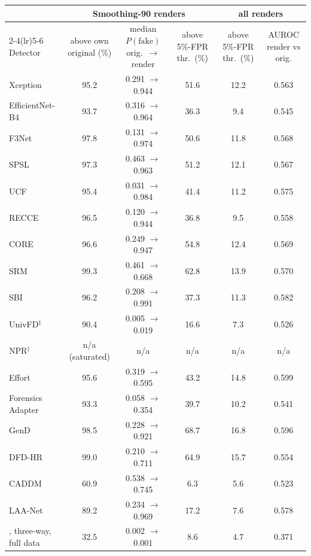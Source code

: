 \begin{tabular}{@{}l ccc cc@{}}
\toprule
 & \multicolumn{3}{c}{Smoothing-90 renders} & \multicolumn{2}{c}{all renders} \\
\cmidrule(lr){2-4}\cmidrule(lr){5-6}
Detector & above own original (\%) & median $P(\text{fake})$ orig.\ $\rightarrow$ render & above 5\%-FPR thr.\ (\%) & above 5\%-FPR thr.\ (\%) & AUROC render vs orig. \\
\midrule
Xception~\cite{xception} & 95.2 & 0.291 $\rightarrow$ 0.944 & 51.6 & 12.2 & 0.563 \\
EfficientNet-B4~\cite{efficientnet} & 93.7 & 0.316 $\rightarrow$ 0.964 & 36.3 & 9.4 & 0.545 \\
F3Net~\cite{f3net} & 97.8 & 0.131 $\rightarrow$ 0.974 & 50.6 & 11.8 & 0.568 \\
SPSL~\cite{spsl} & 97.3 & 0.463 $\rightarrow$ 0.963 & 51.2 & 12.1 & 0.567 \\
UCF~\cite{ucf} & 95.4 & 0.031 $\rightarrow$ 0.984 & 41.4 & 11.2 & 0.575 \\
RECCE~\cite{recce} & 96.5 & 0.120 $\rightarrow$ 0.944 & 36.8 & 9.5 & 0.558 \\
CORE~\cite{core} & 96.6 & 0.249 $\rightarrow$ 0.947 & 54.8 & 12.4 & 0.569 \\
SRM~\cite{srm} & 99.3 & 0.461 $\rightarrow$ 0.668 & 62.8 & 13.9 & 0.570 \\
SBI~\cite{sbi} & 96.2 & 0.208 $\rightarrow$ 0.991 & 37.3 & 11.3 & 0.582 \\
UnivFD$^\ddagger$~\cite{univfd} & 90.4 & 0.005 $\rightarrow$ 0.019 & 16.6 & 7.3 & 0.526 \\
NPR$^\ddagger$~\cite{npr} & n/a (saturated) & n/a & n/a & n/a & n/a \\
Effort~\cite{effort} & 95.6 & 0.319 $\rightarrow$ 0.595 & 43.2 & 14.8 & 0.599 \\
Forensics Adapter~\cite{forensicsadapter} & 93.3 & 0.058 $\rightarrow$ 0.354 & 39.7 & 10.2 & 0.541 \\
GenD~\cite{gend2026} & 98.5 & 0.228 $\rightarrow$ 0.921 & 68.7 & 16.8 & 0.596 \\
DFD-HR~\cite{dfdhr2026} & 99.0 & 0.210 $\rightarrow$ 0.711 & 64.9 & 15.7 & 0.554 \\
CADDM~\cite{caddm} & 60.9 & 0.538 $\rightarrow$ 0.745 & 6.3 & 5.6 & 0.523 \\
LAA-Net~\cite{laanet} & 89.2 & 0.234 $\rightarrow$ 0.969 & 17.2 & 7.6 & 0.578 \\
\midrule
\ours{}, three-way, full data & 32.5 & 0.002 $\rightarrow$ 0.001 & 8.6 & 4.7 & 0.371 \\

\end{tabular}
